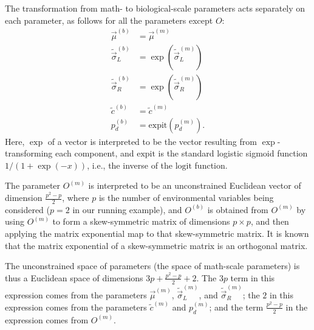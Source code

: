 \documentclass[11pt]{article}
\newcommand{\expit}{\text{expit}}
\newcommand{\logit}{\text{logit}}
\begin{document}
The transformation from math- to biological-scale parameters acts separately on each parameter, 
as follows for all the parameters except $O$:
\begin{align}
\vec{\mu}^{(b)} &= \vec{\mu}^{(m)} \label{eq:mutrans}\\
\tilde{\vec{\sigma}}_L^{(b)} &= \exp(\tilde{\vec{\sigma}}_L^{(m)}) \label{eq:sigLtrans}\\
\tilde{\vec{\sigma}}_R^{(b)} &= \exp(\tilde{\vec{\sigma}}_R^{(m)}) \label{eq:sigRtrans}\\
\tilde{c}^{(b)} &= \tilde{c}^{(m)} \label{eq:ctrans}\\
p_d^{(b)} &= \expit(p_d^{(m)}). \label{eq:pdtrans}
\end{align}
Here, $\exp$ of a vector is interpreted to be the vector resulting from
$\exp$-transforming each component, and $\expit$ is the standard logistic sigmoid
function $1/(1+\exp(-x))$, i.e., the inverse of the $\logit$ function.

The parameter $O^{(m)}$ is interpreted to be an unconstrained Euclidean vector
of dimension $\frac{p^2-p}{2}$, where $p$ is the number of environmental variables being considered
($p=2$ in our running example), and $O^{(b)}$ is obtained from $O^{(m)}$
by using $O^{(m)}$ to form a skew-symmetric matrix of dimensions $p \times p$, 
and then applying the matrix exponential map to that skew-symmetric matrix. It is known that
the matrix exponential of a skew-symmetric matrix is an orthogonal matrix.

The unconstrained space of parameters (the space of math-scale parameters) 
is thus a Euclidean space of dimensions $3p+\frac{p^2-p}{2}+2$. 
The $3p$ term in this expression comes from the parameters $\vec{\mu}^{(m)}$,
$\tilde{\vec{\sigma}}_L^{(m)}$, and $\tilde{\vec{\sigma}}_R^{(m)}$;
the $2$ in this expression comes from the parameters $\tilde{c}^{(m)}$ and
$p_d^{(m)}$; and the term $\frac{p^2-p}{2}$ in the expression comes from
$O^{(m)}$.
\end{document}
